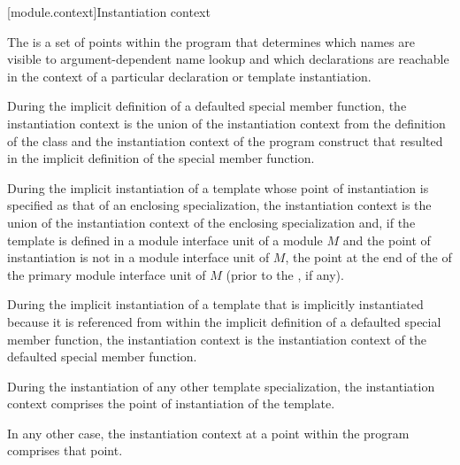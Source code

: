 [module.context]{Instantiation context}

\pnum
The  is a set of points within the program
that determines which names are visible
to argument-dependent name lookup
and which declarations are reachable
in the context of a particular declaration or template instantiation.

\pnum
During the implicit definition of
a defaulted special member function,
the instantiation context is the union of
the instantiation context from the definition of the class and
the instantiation context of the program construct that
resulted in the implicit definition of the special member function.

\pnum
During the implicit instantiation of a template
whose point of instantiation is specified as
that of an enclosing specialization,
the instantiation context is the union of
the instantiation context of the enclosing specialization and,
if the template is defined in a module interface unit of a module $M$
and the point of instantiation is not in a module interface unit of $M$,
the point at the end of the
 of the
primary module interface unit of $M$
(prior to the , if any).

\pnum
During the implicit instantiation of a template
that is implicitly instantiated because it is referenced
from within the implicit definition of a defaulted special member function,
the instantiation context is the instantiation context of
the defaulted special member function.

\pnum
During the instantiation of any other template specialization,
the instantiation context comprises the point of instantiation
of the template.

\pnum
In any other case, the instantiation context
at a point within the program
comprises that point.

